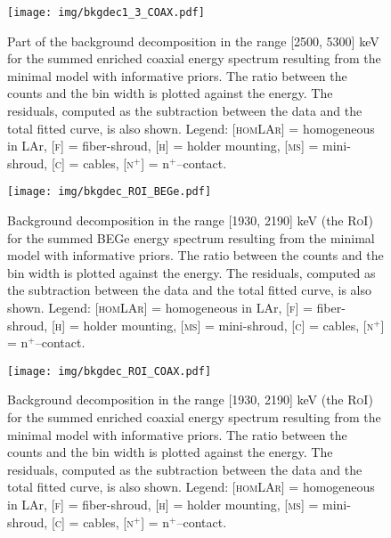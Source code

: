\begin{landscape}
\begin{figure}
	\end{figure}
	\begin{figure}
		\centering
		\texttt{[image: img/bkgdec1\_3\_COAX.pdf]}
		\caption{Part of the background decomposition in the range [2500, 5300] keV for the summed enriched coaxial energy spectrum resulting from the minimal model with informative priors. The ratio between the counts and the bin width is plotted against the energy. The residuals, computed as the subtraction between the data and the total fitted curve, is also shown. Legend: \textsc{[homLAr]} = homogeneous in LAr, \textsc{[f]} = fiber-shroud, \textsc{[h]} = holder mounting, \textsc{[ms]} = mini-shroud, \textsc{[c]} = cables, \textsc{[n$^+$]} = n$^+$--contact.}
	\end{figure}
	\begin{figure}
		\centering
		\texttt{[image: img/bkgdec\_ROI\_BEGe.pdf]}
		\caption{Background decomposition in the range [1930, 2190] keV (the \textsc{RoI}) for the summed BEGe energy spectrum resulting from the minimal model with informative priors. The ratio between the counts and the bin width is plotted against the energy. The residuals, computed as the subtraction between the data and the total fitted curve, is also shown. Legend: \textsc{[homLAr]} = homogeneous in LAr, \textsc{[f]} = fiber-shroud, \textsc{[h]} = holder mounting, \textsc{[ms]} = mini-shroud, \textsc{[c]} = cables, \textsc{[n$^+$]} = n$^+$--contact.}\label{fig:bkgdec_end1}
	\end{figure}
	\begin{figure}
		\centering
		\texttt{[image: img/bkgdec\_ROI\_COAX.pdf]}
		\caption{Background decomposition in the range [1930, 2190] keV (the \textsc{RoI}) for the summed enriched coaxial energy spectrum resulting from the minimal model with informative priors. The ratio between the counts and the bin width is plotted against the energy. The residuals, computed as the subtraction between the data and the total fitted curve, is also shown. Legend: \textsc{[homLAr]} = homogeneous in LAr, \textsc{[f]} = fiber-shroud, \textsc{[h]} = holder mounting, \textsc{[ms]} = mini-shroud, \textsc{[c]} = cables, \textsc{[n$^+$]} = n$^+$--contact.}\label{fig:bkgdec_end2}
	\end{figure}
\end{landscape}
\restoregeometry
